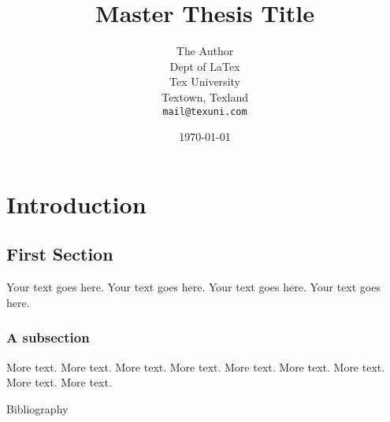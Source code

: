 \documentclass[11pt,titlepage,twoside,openright]{report}
\title{Master Thesis Title}
\author{The Author\\
	Dept of LaTex\\
	Tex University\\
	Textown, Texland\\
	\texttt{mail@texuni.com}}
\date{\today} %
\begin{document}
\maketitle
\tableofcontents
\newpage


\chapter[Chapter Name]{Introduction}

\section[Section Name]{First Section}

Your text goes here.  Your text goes here. Your text goes here. Your text goes here.

\subsection[Subsection Name]{A subsection}

More text. More text. More text.  More text. More text. More text. More text. More text. More text. 






{Bibliography}




\clearpage
{}
\printindex
\printglossary[title=List of Terms,toctitle=Terms and abbreviations]
\end{document}

